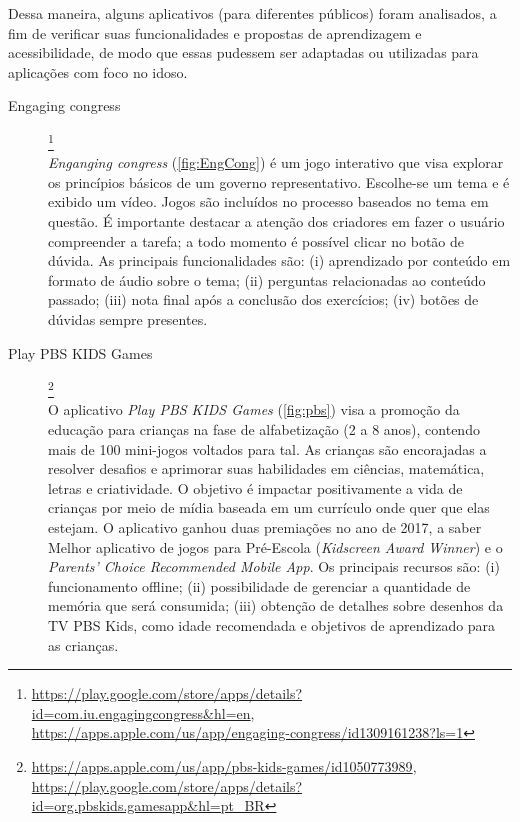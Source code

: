 Dessa maneira, alguns aplicativos (para diferentes públicos) foram analisados, a fim de verificar suas funcionalidades e propostas de aprendizagem e acessibilidade, de modo que essas pudessem ser adaptadas ou utilizadas para aplicações com foco no idoso.

\begin{description}

\item[Engaging congress]\footnote{\url{https://play.google.com/store/apps/details?id=com.iu.engagingcongress&hl=en}, \url{https://apps.apple.com/us/app/engaging-congress/id1309161238?ls=1}} \hfill \\
\textit{Enganging congress} (\autoref{fig:EngCong}) é um jogo interativo que visa explorar os princípios básicos de um governo representativo. Escolhe-se um tema e é exibido um vídeo. Jogos são incluídos no processo baseados no tema em questão. É importante destacar a atenção dos criadores em fazer o usuário compreender a tarefa; a todo momento é possível clicar no botão de dúvida. As principais funcionalidades são: (i) aprendizado por conteúdo em formato de áudio sobre o tema; (ii) perguntas relacionadas ao conteúdo passado; (iii) nota final após a conclusão dos exercícios; (iv) botões de dúvidas sempre presentes.

    

\item[Play PBS KIDS Games]\footnote{\url{https://apps.apple.com/us/app/pbs-kids-games/id1050773989}, \url{https://play.google.com/store/apps/details?id=org.pbskids.gamesapp&hl=pt_BR}} \hfill \\
O aplicativo \textit{Play PBS KIDS Games} (\autoref{fig:pbs}) visa a promoção da educação para crianças na fase de alfabetização (2 a 8 anos), contendo mais de 100 mini-jogos voltados para tal. As crianças são encorajadas a resolver desafios e aprimorar suas habilidades em ciências, matemática, letras e criatividade. O objetivo é impactar positivamente a vida de crianças por meio de mídia baseada em um currículo onde quer que elas estejam. O aplicativo ganhou duas premiações no ano de 2017, a saber Melhor aplicativo de jogos para Pré-Escola (\textit{Kidscreen Award Winner}) e o \textit{Parents' Choice Recommended Mobile App}. Os principais recursos são: (i) funcionamento offline; (ii) possibilidade de gerenciar a quantidade de memória que será consumida; (iii) obtenção de detalhes sobre desenhos da TV PBS Kids, como idade recomendada e objetivos de aprendizado para as crianças.


\end{description}

